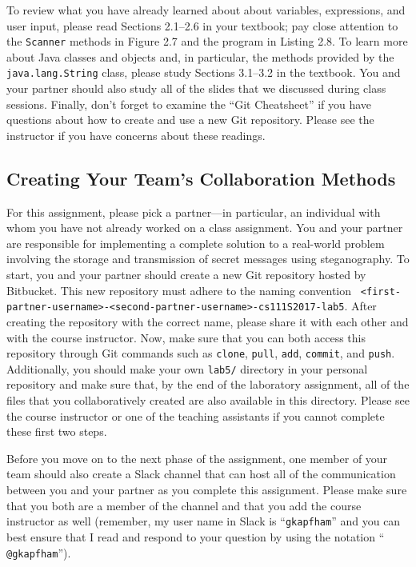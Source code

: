 To review what you have already learned about about variables, expressions, and user input, please read Sections
2.1--2.6 in your textbook; pay close attention to the {\tt Scanner} methods in Figure 2.7 and the program in Listing
2.8. To learn more about Java classes and objects and, in particular, the methods provided by the {\tt java.lang.String}
class, please study Sections 3.1--3.2 in the textbook. You and your partner should also study all of the slides that we
discussed during class sessions. Finally, don't forget to examine the ``Git Cheatsheet'' if you have questions about how
to create and use a new Git repository. Please see the instructor if you have concerns about these readings.

\vspace{-0.05in}
\subsection*{Creating Your Team's Collaboration Methods}
\vspace{-0.05in}

For this assignment, please pick a partner---in particular, an individual with whom you have not already worked on a class
assignment. You and your partner are responsible for implementing a complete solution to a real-world problem involving
the storage and transmission of secret messages using steganography. To start, you and your partner should create a new
Git repository hosted by Bitbucket. This new repository must adhere to the naming convention {\tt
<first-partner-username>-<second-partner-username>-cs111S2017-lab5}. After creating the repository with the correct
name, please share it with each other and with the course instructor. Now, make sure that you can both access this
repository through Git commands such as {\tt clone}, {\tt pull}, {\tt add}, {\tt commit}, and {\tt push}. Additionally,
you should make your own {\tt lab5/} directory in your personal repository and make sure that, by the end of the
laboratory assignment, all of the files that you collaboratively created are also available in this directory. Please
see the course instructor or one of the teaching assistants if you cannot complete these first two steps.

Before you move on to the next phase of the assignment, one member of your team should also create a Slack channel that
can host all of the communication between you and your partner as you complete this assignment. Please make sure that
you both are a member of the channel and that you add the course instructor as well (remember, my user name in Slack is
``{\tt gkapfham}'' and you can best ensure that I read and respond to your question by using the notation ``{\tt
@gkapfham}'').

